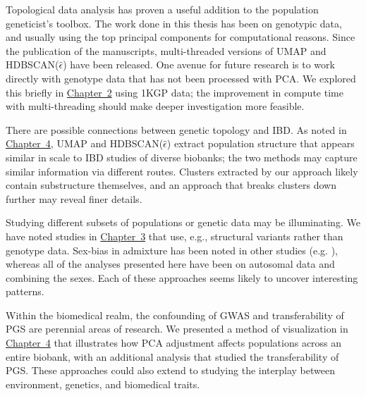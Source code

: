 Topological data analysis has proven a useful addition to the population geneticist's toolbox. The work done in this thesis has been on genotypic data, and usually using the top principal components for computational reasons. Since the publication of the manuscripts, multi-threaded versions of UMAP and HDBSCAN($\hat{\epsilon}$) have been released. One avenue for future research is to work directly with genotype data that has not been processed with PCA. We explored this briefly in \hyperref[chap:chapter2]{Chapter~2} using 1KGP data; the improvement in compute time with multi-threading should make deeper investigation more feasible. 

There are possible connections between genetic topology and IBD. As noted in \hyperref[chap:chapter4]{Chapter~4}, UMAP and HDBSCAN($\hat{\epsilon}$) extract population structure that appears similar in scale to IBD studies of diverse biobanks; the two methods may capture similar information via different routes. Clusters extracted by our approach likely contain substructure themselves, and an approach that breaks clusters down further may reveal finer details.

Studying different subsets of populations or genetic data may be illuminating. We have noted studies in \hyperref[chap:chapter3]{Chapter~3} that use, e.g., structural variants rather than genotype data. Sex-bias in admixture has been noted in other studies (e.g. \citep{ongaro_evaluating_2021,korunes_sex-biased_2022,marcheco-teruel_cuba_2014}), whereas all of the analyses presented here have been on autosomal data and combining the sexes. Each of these approaches seems likely to uncover interesting patterns.

Within the biomedical realm, the confounding of GWAS and transferability of PGS are perennial areas of research. We presented a method of visualization in \hyperref[chap:chapter4]{Chapter~4} that illustrates how PCA adjustment affects populations across an entire biobank, with an additional analysis that studied the transferability of PGS. These approaches could also extend to studying the interplay between environment, genetics, and biomedical traits.